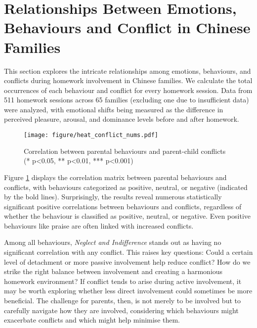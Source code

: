 \section{Relationships Between Emotions, Behaviours and Conflict in Chinese Families}

This section explores the intricate relationships among emotions, behaviours, and conflicts during homework involvement in Chinese families. We calculate the total occurrences of each behaviour and conflict for every homework session. Data from 511 homework sessions across 65 families (excluding one due to insufficient data) were analyzed, with emotional shifts being measured as the difference in perceived pleasure, arousal, and dominance levels before and after homework.


\begin{figure}
    \centering
    \texttt{[image: figure/heat\_conflict\_nums.pdf]}
    \caption{Correlation between parental behaviours and parent-child conflicts (* p<0.05, ** p<0.01, *** p<0.001)}
    \label{fig:heatmap:conflict_behaviours}
\end{figure}


Figure \ref{fig:heatmap:conflict_behaviours} displays the correlation matrix between parental behaviours and conflicts, with behaviours categorized as positive, neutral, or negative (indicated by the bold lines). Surprisingly, the results reveal numerous statistically significant positive correlations between behaviours and conflicts, regardless of whether the behaviour is classified as positive, neutral, or negative. Even positive behaviours like praise are often linked with increased conflicts.

Among all behaviours, \textit{Neglect and Indifference} stands out as having no significant correlation with any conflict. This raises key questions: Could a certain level of detachment or more passive involvement help reduce conflict? How do we strike the right balance between involvement and creating a harmonious homework environment?  %
If conflict tends to arise during active involvement, it may be worth exploring whether less direct involvement could sometimes be more beneficial. The challenge for parents, then, is not merely to be involved but to carefully navigate how they are involved, considering which behaviours might exacerbate conflicts and which might help minimise them.

